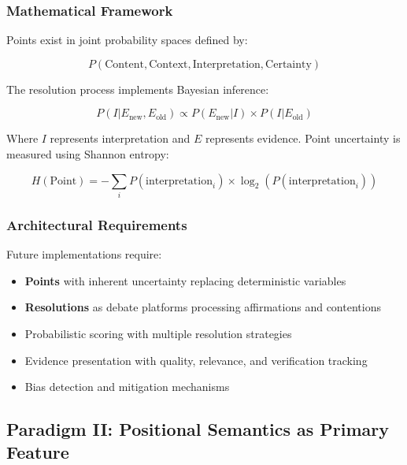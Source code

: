 \documentclass[12pt,a4paper,twoside]{article}
\begin{document}
\subsubsection{Mathematical Framework}

Points exist in joint probability spaces defined by:

\begin{equation}
P(\text{Content}, \text{Context}, \text{Interpretation}, \text{Certainty})
\end{equation}

The resolution process implements Bayesian inference:

\begin{equation}
P(I|E_{\text{new}}, E_{\text{old}}) \propto P(E_{\text{new}}|I) \times P(I|E_{\text{old}})
\end{equation}

Where $I$ represents interpretation and $E$ represents evidence. Point uncertainty is measured using Shannon entropy:

\begin{equation}
H(\text{Point}) = -\sum_i P(\text{interpretation}_i) \times \log_2(P(\text{interpretation}_i))
\end{equation}

\subsubsection{Architectural Requirements}

Future implementations require:

\begin{itemize}
\item \textbf{Points} with inherent uncertainty replacing deterministic variables
\item \textbf{Resolutions} as debate platforms processing affirmations and contentions
\item Probabilistic scoring with multiple resolution strategies
\item Evidence presentation with quality, relevance, and verification tracking
\item Bias detection and mitigation mechanisms
\end{itemize}

\subsection{Paradigm II: Positional Semantics as Primary Feature}
\end{document}
